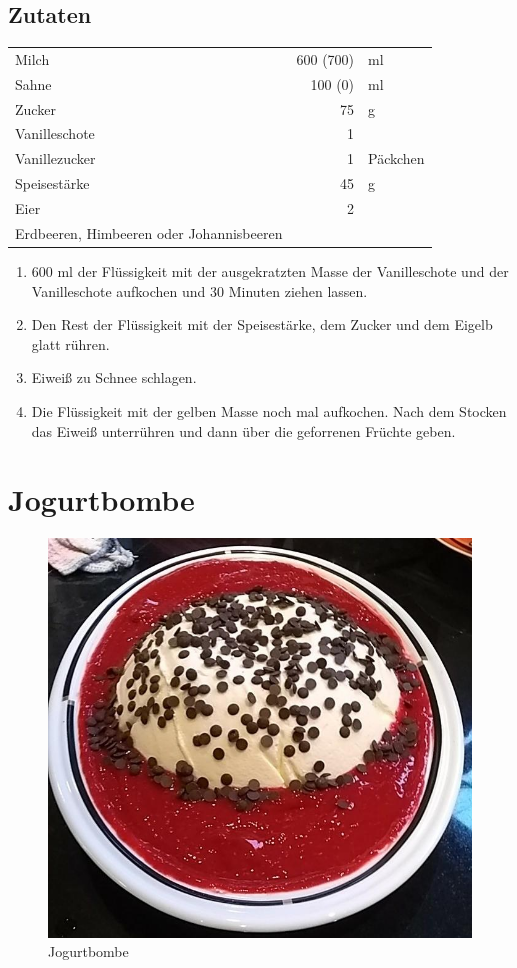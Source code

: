\subsection*{Zutaten}
\begin{tabular}{lrl}
	Milch        &  600 (700) & ml \\
	Sahne                            &  100 (0) & ml \\
	Zucker                           & 75 & g      \\
	Vanilleschote				& 1 &\\
	Vanillezucker & 1 & Päckchen\\
	Speisestärke                            &  45 & g \\
	Eier                            &  2 &   \\
	Erdbeeren, Himbeeren oder Johannisbeeren & & \\
\end{tabular} 


\begin{enumerate}
	\item 600 ml der Flüssigkeit mit der ausgekratzten Masse der Vanilleschote und der Vanilleschote aufkochen  und 30 Minuten ziehen lassen.
	\item Den Rest der Flüssigkeit mit der Speisestärke, dem Zucker und dem Eigelb glatt rühren.
	\item Eiweiß zu Schnee schlagen. 
	\item Die Flüssigkeit mit der gelben Masse noch mal aufkochen. Nach dem Stocken das Eiweiß unterrühren und dann über die geforrenen Früchte geben.
\end{enumerate}


\section{Jogurtbombe}


\begin{figure}[H]
	\centering
	\includegraphics[width=0.46\linewidth]{Bilder/JogurtBombe}
	\caption{Jogurtbombe}
	\label{fig:Jogurtbombe}
\end{figure}



